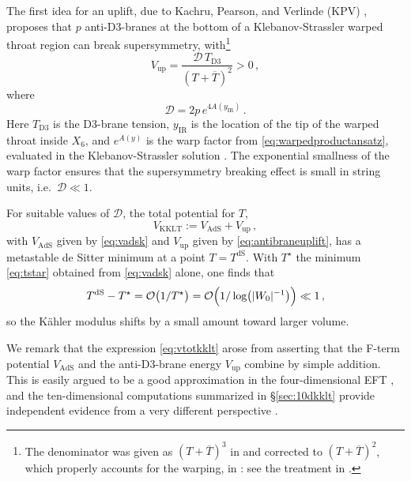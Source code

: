 \documentclass[12pt,a4wide]{article}
\begin{document}
The first idea for an uplift, due to Kachru, Pearson, and Verlinde (KPV) \cite{Kachru:2002gs}, proposes that $p$ anti-D3-branes at the bottom of a Klebanov-Strassler warped throat region can break supersymmetry, with\footnote{The denominator was given as $(T+\overline{T})^3$ in \cite{Kachru:2003aw} and corrected to $(T+\overline{T})^2$, which properly accounts for the warping, in \cite{Kachru:2003sx}: see the treatment in \cite{Junghans:2014xfa}.}
\begin{equation}\label{eq:antibraneuplift}
V_{\text{up}} = \frac{\mathscr{D}\,T_{\text{D3}}}{(T+\overline{T})^2}>0\,,
\end{equation}  where
\begin{equation}\label{eq:antibraneupliftD}
\mathscr{D} = 2p\,  e^{4A(y_{\text{IR}})} \,.
\end{equation} Here $T_{\text{D3}}$ is the D3-brane tension, $y_{\text{IR}}$ is the location of the tip of the warped throat inside $X_6$, and $e^{A(y)}$ is the warp factor from \eqref{eq:warpedproductansatz}, evaluated in the Klebanov-Strassler solution \cite{Klebanov:2000hb}.  The exponential smallness of the warp factor ensures that the supersymmetry breaking effect is small in string units, i.e.~$\mathscr{D} \ll 1$.


For suitable values of $\mathscr{D}$, the total potential for $T$, 
\begin{equation}\label{eq:vtotkklt}
V_{\text{KKLT}} := V_{\text{AdS}} + V_{\text{up}}\,,    
\end{equation}
with $V_{\text{AdS}}$ given by \eqref{eq:vadsk} and $V_{\text{up}}$ given by \eqref{eq:antibraneuplift}, has a metastable de Sitter minimum at a point $T=T^{\text{dS}}$.  With $T^{\star}$ the minimum \eqref{eq:tstar} obtained from \eqref{eq:vadsk} alone, one finds that 
\begin{equation}
    T^{\text{dS}}-T^{\star} = \mathcal{O}\bigl(1/{T^{\star}}\bigr) = \mathcal{O}\Bigl(1/\,\text{log}\bigl(|W_0|^{-1}\bigr)\Bigr) \ll 1\,,
\end{equation}
so the K\"ahler modulus shifts by a small amount toward larger volume.  

We remark that the expression \eqref{eq:vtotkklt} arose from asserting that the F-term potential $V_{\text{AdS}}$ and the anti-D3-brane energy $V_{\text{up}}$ combine by simple addition.  This is easily argued to be a good approximation in the four-dimensional EFT \cite{Kachru:2003aw}, and the ten-dimensional computations summarized in \S\ref{sec:10dkklt} provide independent evidence from a very different perspective \cite{Kachru:2019dvo}.   
\end{document}
